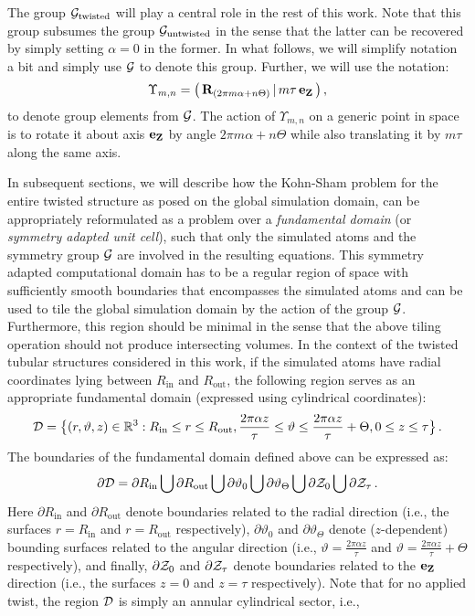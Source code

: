 \documentclass[preprint,12pt, 3p, sort&compress]{elsarticle}
\begin{document}
The group ${\cal G}_{\text{twisted}}$ will play a central role in the rest of this work.  Note that this group  subsumes the group ${\cal G}_{\text{untwisted}}$ in the sense that the latter can be recovered by simply setting $\alpha = 0$ in the former. In what follows, we will simplify notation a bit and simply use ${\cal G}$ to denote this group. Further, we will use the notation:
\begin{align}
\Upsilon_{m,n}  = \big(\,{{\bf R}}_{(2\pi m\alpha + n\Theta)} \,|\,m\tau\,{\bf e}_{{\bf Z}}\,\big)\,,
\end{align}
to denote group elements from ${\cal G}$. The action of $\Upsilon_{m,n}$ on a generic point in space is to rotate it about axis ${\bf e}_{{\bf Z}}$ by angle $2\pi m\alpha + n\Theta$ while also translating it by $m\tau$ along the same axis.

In subsequent sections, we will describe how the Kohn-Sham problem for the entire twisted structure as posed on the global simulation domain, can be appropriately reformulated as a problem over a \textit{fundamental domain} (or \textit{symmetry adapted unit cell}), such that only the simulated atoms and the symmetry group ${\cal G}$ are involved in the resulting equations. This symmetry adapted computational domain has to be a regular region of space with sufficiently smooth boundaries that encompasses the simulated atoms and can be used to tile the global simulation domain by the action of the group ${\cal G}$. Furthermore, this region should be minimal in the sense that the above tiling operation should not produce intersecting volumes. In the context of the twisted tubular structures considered in this work, if the simulated atoms have radial coordinates lying between $R_{\text{in}}$ and $R_{\text{out}}$, the following region serves as an appropriate fundamental domain (expressed using cylindrical coordinates):
\begin{align}
{\cal D} =  \big\{(r,\vartheta,z) \in \mathbb{R}^3:R_{\text{in}} \leq r\leq R_{\text{out}}, \frac{2\pi\alpha z}{\tau} \leq \vartheta \leq \frac{2\pi\alpha z}{\tau} + \Theta, 0 \leq z \leq \tau\big\}\,.
\label{eq:fundamental_domain}
\end{align}
The boundaries of the fundamental domain defined above can be expressed as:
\begin{align}
\partial{\cal D}= \partial R_{\text{in}} \bigcup \partial R_{\text{out}} \bigcup \partial\vartheta_{0} \bigcup \partial\vartheta_{\Theta}\bigcup\partial{\cal Z}_0\bigcup\partial{\cal Z}_{\tau}\,.
\label{eq:calD_boundary}
\end{align}
Here $\partial R_{\text{in}}$ and  $\partial R_{\text{out}}$ denote boundaries related to the radial direction (i.e., the surfaces $r = R_{\text{in}}$ and $r = R_{\text{out}}$ respectively), $\partial\vartheta_{0}$ and $\partial\vartheta_{\Theta}$ denote ($z$-dependent) bounding surfaces related to the angular direction (i.e., $\vartheta = \frac{2\pi\alpha z}{\tau}$ and $\vartheta = \frac{2\pi\alpha z}{\tau} + \Theta$ respectively), and finally, $\partial{\cal Z}_0$ and $\partial{\cal Z}_{\tau}$ denote boundaries related to the ${\bf e}_{{\bf Z}}$ direction (i.e., the surfaces $z = 0$ and $z = \tau$ respectively). Note that for no applied twist, the region ${\cal D}$ is simply an annular cylindrical sector, i.e., 
\end{document}
